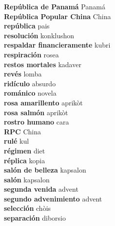 \textbf{ República de Panamá  } Panamá \\
\textbf{ República Popular China  } China \\
\textbf{ república  } pais \\
\textbf{ resolución  } konklushon \\
\textbf{ respaldar financieramente  } kubri \\
\textbf{ respiración  } rosea \\
\textbf{ restos mortales  } kadaver \\
\textbf{ revés  } lomba \\
\textbf{ ridículo  } absurdo \\
\textbf{ románico  } novela \\
\textbf{ rosa amarillento  } aprikòt \\
\textbf{ rosa salmón  } aprikòt \\
\textbf{ rostro humano  } cara \\
\textbf{ RPC  } China \\
\textbf{ rulé  } kul \\
\textbf{ régimen  } diet \\
\textbf{ réplica  } kopia \\
\textbf{ salón de belleza  } kapsalon \\
\textbf{ salón  } kapsalon \\
\textbf{ segunda venida  } advent \\
\textbf{ segundo advenimiento  } advent \\
\textbf{ selección  } chòis \\
\textbf{ separación  } diborsio \\
